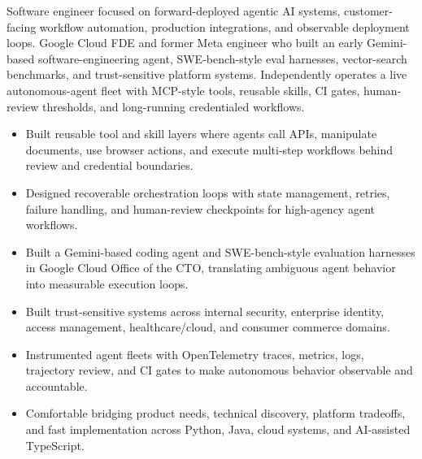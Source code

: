 


Software engineer focused on forward-deployed agentic AI systems, customer-facing workflow automation, production integrations, and observable deployment loops. Google Cloud FDE and former Meta engineer who built an early Gemini-based software-engineering agent, SWE-bench-style eval harnesses, vector-search benchmarks, and trust-sensitive platform systems. Independently operates a live autonomous-agent fleet with MCP-style tools, reusable skills, CI gates, human-review thresholds, and long-running credentialed workflows.
\begin{itemize}
  \item Built reusable tool and skill layers where agents call APIs, manipulate documents, use browser actions, and execute multi-step workflows behind review and credential boundaries.
  \item Designed recoverable orchestration loops with state management, retries, failure handling, and human-review checkpoints for high-agency agent workflows.
  \item Built a Gemini-based coding agent and SWE-bench-style evaluation harnesses in Google Cloud Office of the CTO, translating ambiguous agent behavior into measurable execution loops.
\end{itemize}
\begin{itemize}
  \item Built trust-sensitive systems across internal security, enterprise identity, access management, healthcare/cloud, and consumer commerce domains.
  \item Instrumented agent fleets with OpenTelemetry traces, metrics, logs, trajectory review, and CI gates to make autonomous behavior observable and accountable.
  \item Comfortable bridging product needs, technical discovery, platform tradeoffs, and fast implementation across Python, Java, cloud systems, and AI-assisted TypeScript.
\end{itemize}




